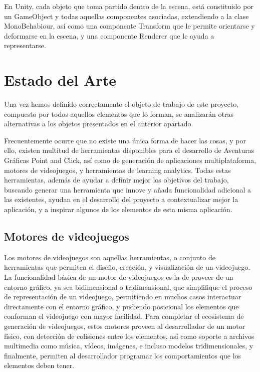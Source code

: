 En Unity, cada objeto que toma partido dentro de la escena, está constituido por un GameObject y todas aquellas componentes asociadas, extendiendo a la clase MonoBehabiour, así como una componente Transform que le permite orientarse y deformarse en la escena, y una componente Renderer que le ayuda a representarse.

\section{Estado del Arte}
\label{estadodelarte}

Una vez hemos definido correctamente el objeto de trabajo de este proyecto, compuesto por todos aquellos elementos que lo forman, se analizarán otras alternativas a los objetos presentados en el anterior apartado. 

Frecuentemente ocurre que no existe una única forma de hacer las cosas, y por ello, existen multitud de herramientas disponibles para el desarrollo de Aventuras Gráficas Point and Click, así como de generación de aplicaciones multiplataforma, motores de videojuegos, y herramientas de learning analytics. Todas estas herramientas, además de ayudar a definir mejor los objetivos del trabajo, buscando generar una herramienta que innove y añada funcionalidad adicional a las existentes, ayudan en el desarrollo del proyecto a contextualizar mejor la aplicación, y a inspirar algunos de los elementos de esta misma aplicación.

\subsection{Motores de videojuegos}
\label{motoresdevideojuegos}

Los motores de videojuegos son aquellas herramientas, o conjunto de herramientas que permiten el diseño, creación, y visualización de un videojuego. La funcionalidad básica de un motor de videojuegos es la de proveer de un entorno gráfico, ya sea bidimensional o tridimensional, que simplifique el proceso de representación de un videojuego, permitiendo en muchos casos interactuar directamente con el entorno gráfico, y pudiendo posicional los elementos que conforman el videojuego con mayor facilidad. Para completar el ecosistema de generación de videojuegos, estos motores proveen al desarrollador de un motor físico, con detección de colisiones entre los elementos, así como soporte a archivos multimedia como música, vídeos, imágenes, e incluso modelos tridimensionales, y finalmente, permiten al desarrollador programar los comportamientos que los elementos deben tener.

